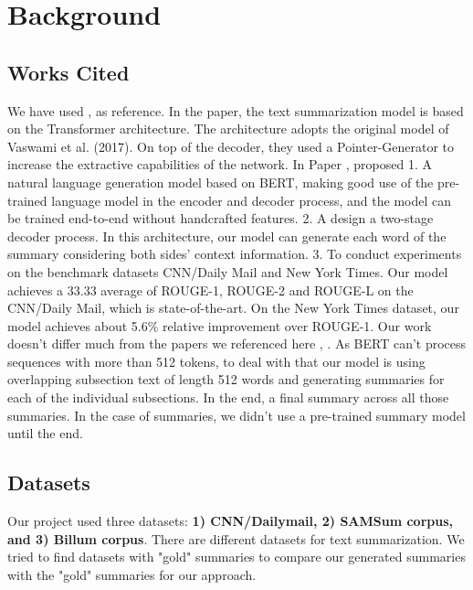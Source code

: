 \documentclass[twoside,twocolumn]{article}
\begin{document}

\section{Background}




\subsection{Works Cited}
We have used \cite{aksenov2020abstractive}, \cite{zhang2019pretraining} as reference. In the \cite{aksenov2020abstractive} paper, the text summarization model is based on the Transformer architecture. The architecture adopts the original model of Vaswami et al. (2017). On top of the decoder, they used a Pointer-Generator to increase the extractive capabilities of the network. In Paper \cite{zhang2019pretraining}, proposed 1. A natural language generation model based on BERT, making good use of the pre-trained language model in the encoder and decoder process, and the model can be trained end-to-end without handcrafted features. 2. A design a two-stage decoder process. In this architecture, our model can generate each word of the summary considering both sides’ context information. 3. To conduct experiments on the benchmark datasets CNN/Daily Mail and New York Times. Our model achieves a 33.33 average of ROUGE-1, ROUGE-2 and ROUGE-L on the CNN/Daily Mail, which is state-of-the-art. On the New York Times dataset, our model achieves about 5.6\% relative improvement over ROUGE-1. 
Our work doesn't differ much from the papers we referenced here \cite{aksenov2020abstractive}, \cite{zhang2019pretraining}. As BERT can't process sequences with more than 512 tokens, to deal with that our model is using overlapping subsection text of length 512 words and generating summaries for each of the individual subsections. In the end, a final summary across all those summaries. In the case of summaries, we didn't use a pre-trained summary model until the end.



\subsection{Datasets}

Our project used three datasets: \textbf{1) CNN/Dailymail, 2) SAMSum corpus, and 3) Billum corpus}. There are different datasets for text summarization. We tried to find datasets with "gold" summaries to compare our generated summaries with the "gold" summaries for our approach.\par 
\end{document}
